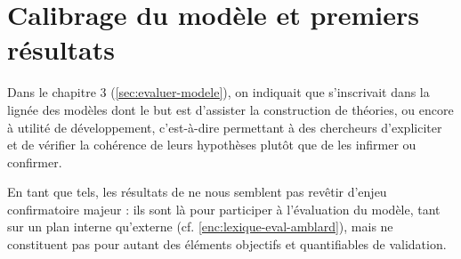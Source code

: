 \clearpage
\section{Calibrage du modèle et premiers résultats}

Dans le chapitre 3 (\cref{sec:evaluer-modele}), on indiquait que \simfeodal{} s'inscrivait dans la lignée des  modèles dont le but est d'\og assister la construction de théories\fg{}, ou encore \og à utilité de développement\fg{}, c'est-à-dire permettant à des chercheurs d'expliciter et de vérifier la cohérence de leurs hypothèses plutôt que de les infirmer ou confirmer.

En tant que tels, les résultats de \simfeodal{} ne nous semblent pas revêtir d'enjeu confirmatoire majeur : ils sont là pour participer à l'évaluation du modèle, tant sur un plan interne qu'externe (cf. \cref{enc:lexique-eval-amblard}), mais ne constituent pas pour autant des éléments objectifs et quantifiables de validation.

